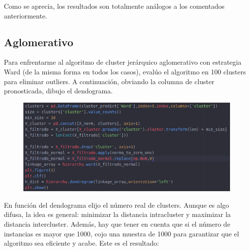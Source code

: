 Como se aprecia, los resultados son totalmente análogos a los comentados anteriormente.

\subsection{Aglomerativo}

Para enfrentarme al algoritmo de cluster jerárquico aglomerativo con estrategia Ward (de la misma forma en todos los casos), evalúo el algoritmo en 100 clusters para eliminar outliers. A continuación, obviando la columna de cluster pronosticada, dibujo el dendograma.

\begin{figure}[H] %
	\centering
	\includegraphics[scale=0.5]{capt2.png}  %
	\label{fig:conf2}
\end{figure}


 En función del dendograma elijo el número real de clusters. Aunque es algo difusa, la idea es general: minimizar la distancia intracluster y maximizar la distancia intercluster. Además, hay que tener en cuenta que si el número de instancias es mayor que 1000, cojo una muestra de 1000 para garantizar que el algoritmo sea eficiente y acabe. Este es el resultado:

